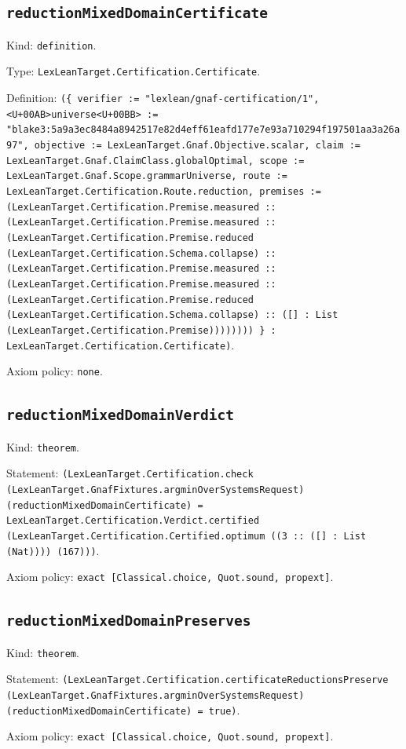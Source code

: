 \documentclass[11pt]{article}
\begin{document}
\subsection*{\texttt{reductionMixedDomainCertificate}}
\noindent Kind: \texttt{definition}.\par
\noindent Type: \texttt{LexLeanTarget.Certification.Certificate}.\par
\noindent Definition: \texttt{(\{ verifier := "lexlean/gnaf-certification/1", <U+00AB>universe<U+00BB> := "blake3:5a9a3ec8484a8942517e82d4eff61eafd177e7e93a710294f197501aa3a26a97", objective := LexLeanTarget.Gnaf.Objective.scalar, claim := LexLeanTarget.Gnaf.ClaimClass.globalOptimal, scope := LexLeanTarget.Gnaf.Scope.grammarUniverse, route := LexLeanTarget.Certification.Route.reduction, premises := (LexLeanTarget.Certification.Premise.measured :: (LexLeanTarget.Certification.Premise.measured :: (LexLeanTarget.Certification.Premise.reduced (LexLeanTarget.Certification.Schema.collapse) :: (LexLeanTarget.Certification.Premise.measured :: (LexLeanTarget.Certification.Premise.measured :: (LexLeanTarget.Certification.Premise.reduced (LexLeanTarget.Certification.Schema.collapse) :: ([] : List (LexLeanTarget.Certification.Premise)))))))) \} : LexLeanTarget.Certification.Certificate)}.\par
\noindent Axiom policy: \texttt{none}.\par
\subsection*{\texttt{reductionMixedDomainVerdict}}
\noindent Kind: \texttt{theorem}.\par
\noindent Statement: \texttt{(LexLeanTarget.Certification.check (LexLeanTarget.GnafFixtures.argminOverSystemsRequest) (reductionMixedDomainCertificate) = LexLeanTarget.Certification.Verdict.certified (LexLeanTarget.Certification.Certified.optimum ((3 :: ([] : List (Nat)))) (167)))}.\par
\noindent Axiom policy: \texttt{exact [Classical.choice, Quot.sound, propext]}.\par
\subsection*{\texttt{reductionMixedDomainPreserves}}
\noindent Kind: \texttt{theorem}.\par
\noindent Statement: \texttt{(LexLeanTarget.Certification.certificateReductionsPreserve (LexLeanTarget.GnafFixtures.argminOverSystemsRequest) (reductionMixedDomainCertificate) = true)}.\par
\noindent Axiom policy: \texttt{exact [Classical.choice, Quot.sound, propext]}.\par
\end{document}
